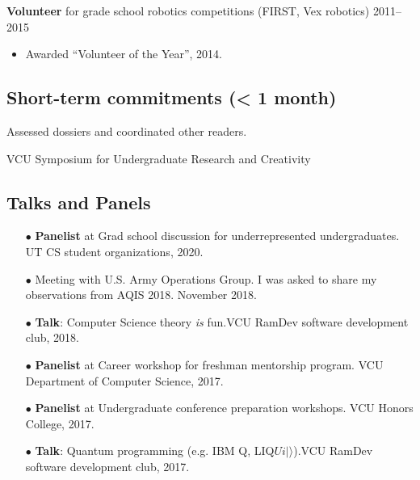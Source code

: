 \documentclass[11pt,letterpaper,serif]{moderncv}
\begin{document}

{\textbf{Volunteer} for grade school robotics competitions (FIRST, Vex robotics)}
{2011--2015}{}
{
	\begin{adjustwidth}{.25in}{}
		\begin{itemize}
			\item Awarded ``Volunteer of the Year'', 2014.
		\end{itemize}
	\end{adjustwidth}
}


\smallskip
\subsection{Short-term commitments (< 1 month)}



{
	\begin{adjustwidth}{.25in}{}
		Assessed dossiers and coordinated other readers.
	\end{adjustwidth}
}

{
	\begin{adjustwidth}{.25in}{}
		VCU Symposium for Undergraduate Research and Creativity
	\end{adjustwidth}
}


\smallskip
\subsection{Talks and Panels}

\begin{itemize}
	\item[$\bullet$] \textbf{Panelist} at Grad school discussion for underrepresented undergraduates. UT CS student organizations, 2020.
	\item[$\bullet$] Meeting with U.S. Army Operations Group. I was asked to share my observations from AQIS 2018. November 2018.
	\item[$\bullet$] \textbf{Talk}: Computer Science theory \emph{is} fun.\quad VCU RamDev software development club, 2018.
	\item[$\bullet$] \textbf{Panelist} at Career workshop for freshman mentorship program. VCU Department of Computer Science, 2017.
	\item[$\bullet$] \textbf{Panelist} at Undergraduate conference preparation workshops. VCU Honors College, 2017.
	\item[$\bullet$] \textbf{Talk}: Quantum programming (e.g. IBM Q, LIQ$Ui|\rangle$).\quad VCU RamDev software development club, 2017.
\end{itemize}
\end{document}
